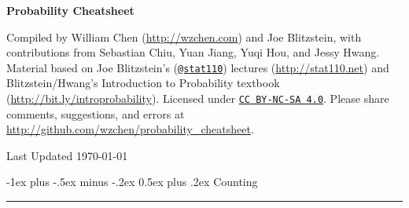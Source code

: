 \documentclass[10pt,landscape]{article}
\makeatletter
\renewcommand{\section}{\@startsection{section}{1}{0mm}%
{-1ex plus -.5ex minus -.2ex}%
{0.5ex plus .2ex}%
{\normalfont\large\bfseries}}
\makeatother
\begin{document}
    \raggedright
    \footnotesize
    \begin{multicols*}{3}

        \setlength{\premulticols}{1pt}
        \setlength{\postmulticols}{1pt}
        \setlength{\multicolsep}{1pt}
        \setlength{\columnsep}{2pt}


        \begin{center}
        {\Large{\textbf{Probability Cheatsheet}}} \\

        \end{center}


        \scriptsize

        Compiled by William Chen (\url{http://wzchen.com}) and Joe Blitzstein, with contributions from Sebastian Chiu, Yuan Jiang, Yuqi Hou, and Jessy Hwang. Material based on Joe Blitzstein's (\texttt{\href{http://twitter.com/stat110}{@stat110}}) lectures (\url{http://stat110.net}) and Blitzstein/Hwang's Introduction to Probability textbook (\url{http://bit.ly/introprobability}). Licensed under \texttt{\href{http://creativecommons.org/licenses/by-nc-sa/4.0/}{CC BY-NC-SA 4.0}}. Please share comments, suggestions, and errors at \url{http://github.com/wzchen/probability_cheatsheet}.

        \begin{center}
            Last Updated \today
        \end{center}




        \section{Counting}\smallskip \hrule height 2pt \smallskip


\end{multicols*}
\end{document}
